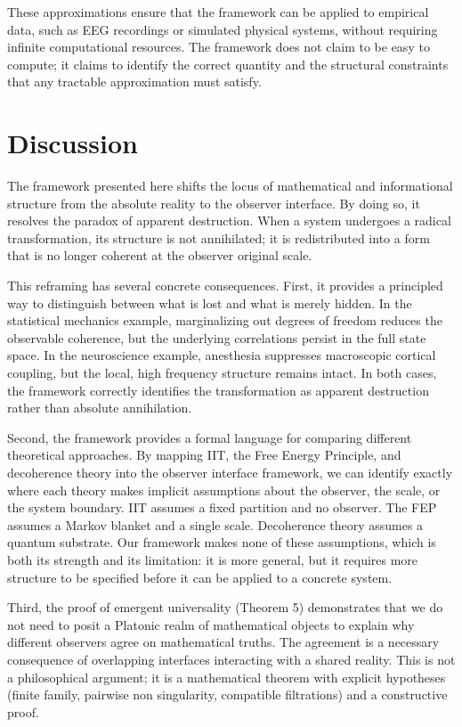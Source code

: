 \documentclass[12pt]{article}
\theoremstyle{definition}
\begin{document}
These approximations ensure that the framework can be applied to empirical data, such as EEG recordings or simulated physical systems, without requiring infinite computational resources. The framework does not claim to be easy to compute; it claims to identify the correct quantity and the structural constraints that any tractable approximation must satisfy.

\section{Discussion}

The framework presented here shifts the locus of mathematical and informational structure from the absolute reality to the observer interface. By doing so, it resolves the paradox of apparent destruction. When a system undergoes a radical transformation, its structure is not annihilated; it is redistributed into a form that is no longer coherent at the observer original scale.

This reframing has several concrete consequences. First, it provides a principled way to distinguish between what is lost and what is merely hidden. In the statistical mechanics example, marginalizing out degrees of freedom reduces the observable coherence, but the underlying correlations persist in the full state space. In the neuroscience example, anesthesia suppresses macroscopic cortical coupling, but the local, high frequency structure remains intact. In both cases, the framework correctly identifies the transformation as apparent destruction rather than absolute annihilation.

Second, the framework provides a formal language for comparing different theoretical approaches. By mapping IIT, the Free Energy Principle, and decoherence theory into the observer interface framework, we can identify exactly where each theory makes implicit assumptions about the observer, the scale, or the system boundary. IIT assumes a fixed partition and no observer. The FEP assumes a Markov blanket and a single scale. Decoherence theory assumes a quantum substrate. Our framework makes none of these assumptions, which is both its strength and its limitation: it is more general, but it requires more structure to be specified before it can be applied to a concrete system.

Third, the proof of emergent universality (Theorem 5) demonstrates that we do not need to posit a Platonic realm of mathematical objects to explain why different observers agree on mathematical truths. The agreement is a necessary consequence of overlapping interfaces interacting with a shared reality. This is not a philosophical argument; it is a mathematical theorem with explicit hypotheses (finite family, pairwise non singularity, compatible filtrations) and a constructive proof.
\end{document}
